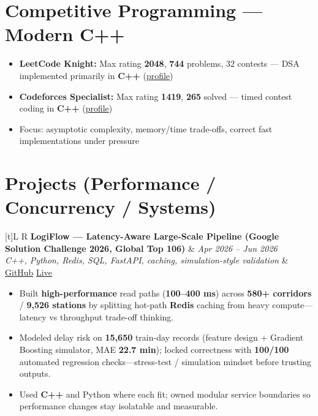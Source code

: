\documentclass[a4paper,10pt]{article}
\newcommand{\resumeProject}[4]{%
  \vspace{0.4mm}
  \noindent
  \begin{tabularx}{\textwidth}[t]{L R}
    \textbf{#1} & \textit{#3} \\
    \textit{#2} & #4 \\
  \end{tabularx}
  \vspace{-0.4mm}%
}
\begin{document}
\section{Competitive Programming --- Modern C++}
\small
\begin{itemize}
  \item \textbf{LeetCode Knight:} Max rating \textbf{2048}, \textbf{744} problems, 32 contests --- DSA implemented primarily in \textbf{C++} (\href{https://leetcode.com/Oju_Srivastava}{profile})
  \item \textbf{Codeforces Specialist:} Max rating \textbf{1419}, \textbf{265} solved --- timed contest coding in \textbf{C++} (\href{https://codeforces.com/profile/Oju}{profile})
  \item Focus: asymptotic complexity, memory/time trade-offs, correct fast implementations under pressure
\end{itemize}

\section{Projects (Performance / Concurrency / Systems)}
\small

\resumeProject
  {LogiFlow --- Latency-Aware Large-Scale Pipeline (Google Solution Challenge 2026, Global Top 106)}
  {C++, Python, Redis, SQL, FastAPI, caching, simulation-style validation}
  {Apr 2026 -- Jun 2026}
  {\href{https://github.com/Ojas-Srivastava05/LogiFlow-Solution-Challenge-2026}{GitHub} \textbar{} \href{https://logi-flow-solution-challenge-2026.vercel.app/}{Live}}
\begin{itemize}
  \item Built \textbf{high-performance} read paths (\textbf{100--400 ms}) across \textbf{580+ corridors} / \textbf{9,526 stations} by splitting hot-path \textbf{Redis} caching from heavy compute---latency vs throughput trade-off thinking.
  \item Modeled delay risk on \textbf{15,650} train-day records (feature design + Gradient Boosting simulator, MAE \textbf{22.7 min}); locked correctness with \textbf{100/100} automated regression checks---stress-test / simulation mindset before trusting outputs.
  \item Used \textbf{C++} and Python where each fit; owned modular service boundaries so performance changes stay isolatable and measurable.
\end{itemize}
\end{document}
